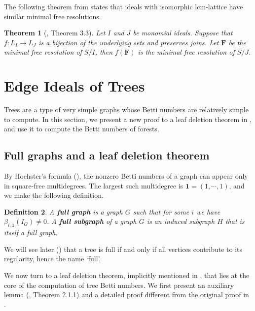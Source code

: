\documentclass[dvipsnames,10pt]{article}
\newtheorem{theorem}{Theorem}[section]
\newtheorem{defi}[theorem]{Definition}
\begin{document}
The following theorem from \cite{welker1999lcm} states that ideals with isomorphic lcm-lattice have similar minimal free resolutions.

\begin{theorem}[\cite{welker1999lcm}, Theorem 3.3]
    Let $I$ and $J$ be monomial ideals. Suppose that $f:L_I\to L_J$ is a bijection of the underlying sets and preserves joins. Let $\mathbf{F}$ be the minimal free resolution of $S/I$, then $f(\mathbf{F})$ is the minimal free resolution of $S/J$.
\end{theorem}

\section{Edge Ideals of Trees}

Trees are a type of very simple graphs whose Betti numbers are relatively simple to compute. In this section, we present a new proof to a leaf deletion theorem in \cite{bouchat}, and use it to compute the Betti numbers of forests.

\subsection{Full graphs and a leaf deletion theorem}

By Hochster's formula (), the nonzero Betti numbers of a graph can appear only in square-free multidegrees. The largest such multidegree is $\mathbf{1}=(1,\cdots,1)$, and we make the following definition.
\begin{defi}
    A \textbf{full graph} is a graph $G$ such that for some $i$ we have $\beta_{i,\mathbf{1}}(I_G)\neq 0$. A \textbf{full subgraph} of a graph $G$ is an induced subgraph $H$ that is itself a full graph.
\end{defi}
We will see later () that a tree is full if and only if all vertices contribute to its regularity, hence the name `full'.

We now turn to a leaf deletion theorem, implicitly mentioned in \cite{bouchat}, that lies at the core of the computation of tree Betti numbers. We first present an auxiliary lemma (\cite{bouchat}, Theorem 2.1.1) and a detailed proof different from the original proof in \cite{bouchat}.
\end{document}
